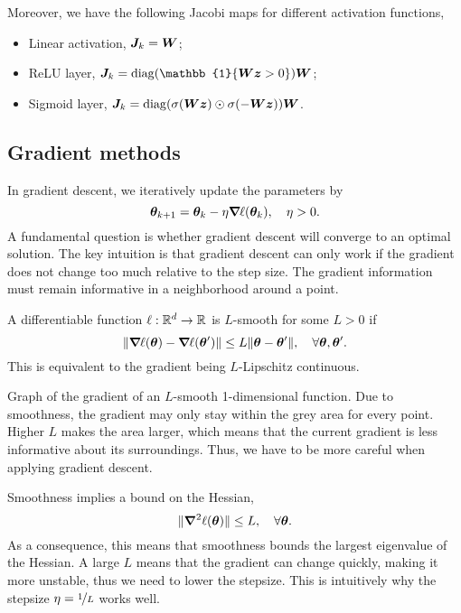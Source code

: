 Moreover, we have the following Jacobi maps for different activation functions,
\begin{itemize}
    \item Linear activation, $\bm{J}_k = \bm{W}$;
    \item ReLU layer, $\mat{J}_k = \mathrm{diag}(\mathbb{1}\{ \mat{W}\vec{z} > 0 \}) \mat{W}$;
    \item Sigmoid layer, $\bm{J}_k = \mathrm{diag}(\sigma(\bm{W} \bm{z}) \odot \sigma(-\bm{W} \bm{z}))
              \bm{W}$.
\end{itemize}

\subsection{Gradient methods}

In gradient descent, we iteratively update the parameters by \[
    \bm{\theta}_{k+1} = \bm{\theta}_k - \eta \bm{\nabla}_{\! } \ell(\bm{\theta}_k), \quad \eta > 0.
\]
A fundamental question is whether gradient descent will converge to an optimal solution. The key
intuition is that gradient descent can only work if the gradient does not change too much relative
to the step size. The gradient information must remain informative in a neighborhood around a
point.

\begin{definition}[Smoothness]
    A differentiable function $\ell: \mathbb{R}^d \to \mathbb{R}$ is $L$-smooth for some $L > 0$ if \[
        \| \bm{\nabla}_{\! } \ell(\bm{\theta}) - \bm{\nabla}_{\! } \ell(\bm{\theta}') \| \leq L \| \bm{\theta} - \bm{\theta}' \|, \quad \forall \bm{\theta}, \bm{\theta}'.
    \]
    This is equivalent to the gradient being $L$-Lipschitz continuous.
\end{definition}

\begin{marginfigure}
    \centering
    \caption{Graph of the gradient of an $L$-smooth 1-dimensional function. Due to smoothness, the
        gradient may only stay within the grey area for every point. Higher $L$ makes the area larger, which means that
        the current gradient is less informative about its surroundings. Thus, we have to be more
        careful when applying gradient descent.}
    \label{fig:smoothness}
\end{marginfigure}

Smoothness implies a bound on the Hessian, \[
    \| \bm{\nabla}^2_{\! } \ell(\bm{\theta}) \| \leq L, \quad \forall \bm{\theta}.
\]
As a consequence, this means that smoothness bounds the largest eigenvalue of the Hessian. A large
$L$ means that the gradient can change quickly, making it more unstable, thus we need to lower the
stepsize. This is intuitively why the stepsize $\eta = \nicefrac{1}{L}$ works well.

